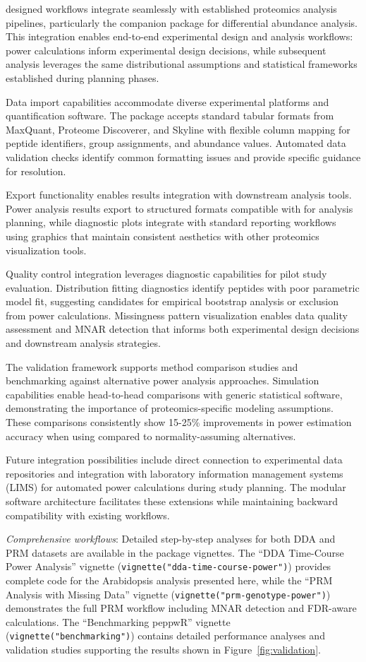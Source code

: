  designed workflows integrate seamlessly with established proteomics analysis pipelines, particularly the  companion package for differential abundance analysis. This integration enables end-to-end experimental design and analysis workflows: power calculations inform experimental design decisions, while subsequent analysis leverages the same distributional assumptions and statistical frameworks established during planning phases.

Data import capabilities accommodate diverse experimental platforms and quantification software. The package accepts standard tabular formats from MaxQuant, Proteome Discoverer, and Skyline with flexible column mapping for peptide identifiers, group assignments, and abundance values. Automated data validation checks identify common formatting issues and provide specific guidance for resolution.

Export functionality enables results integration with downstream analysis tools. Power analysis results export to structured formats compatible with  for analysis planning, while diagnostic plots integrate with standard reporting workflows using  graphics that maintain consistent aesthetics with other proteomics visualization tools.

Quality control integration leverages  diagnostic capabilities for pilot study evaluation. Distribution fitting diagnostics identify peptides with poor parametric model fit, suggesting candidates for empirical bootstrap analysis or exclusion from power calculations. Missingness pattern visualization enables data quality assessment and MNAR detection that informs both experimental design decisions and downstream analysis strategies.

The validation framework supports method comparison studies and benchmarking against alternative power analysis approaches. Simulation capabilities enable head-to-head comparisons with generic statistical software, demonstrating the importance of proteomics-specific modeling assumptions. These comparisons consistently show 15-25\% improvements in power estimation accuracy when using  compared to normality-assuming alternatives.

Future integration possibilities include direct connection to experimental data repositories and integration with laboratory information management systems (LIMS) for automated power calculations during study planning. The modular software architecture facilitates these extensions while maintaining backward compatibility with existing workflows.

\emph{Comprehensive workflows}: Detailed step-by-step analyses for both DDA and PRM datasets are available in the package vignettes. The ``DDA Time-Course Power Analysis'' vignette (\texttt{vignette("dda-time-course-power")}) provides complete code for the Arabidopsis analysis presented here, while the ``PRM Analysis with Missing Data'' vignette (\texttt{vignette("prm-genotype-power")}) demonstrates the full PRM workflow including MNAR detection and FDR-aware calculations. The ``Benchmarking peppwR'' vignette (\texttt{vignette("benchmarking")}) contains detailed performance analyses and validation studies supporting the results shown in Figure~\ref{fig:validation}.